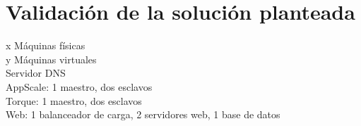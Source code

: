 \chapter{Validación de la solución planteada}
\label{cap:validación}

x Máquinas físicas\\
y Máquinas virtuales\\
Servidor DNS\\
AppScale: 1 maestro, dos esclavos\\
Torque: 1 maestro, dos esclavos\\
Web: 1 balanceador de carga, 2 servidores web, 1 base de datos\\
